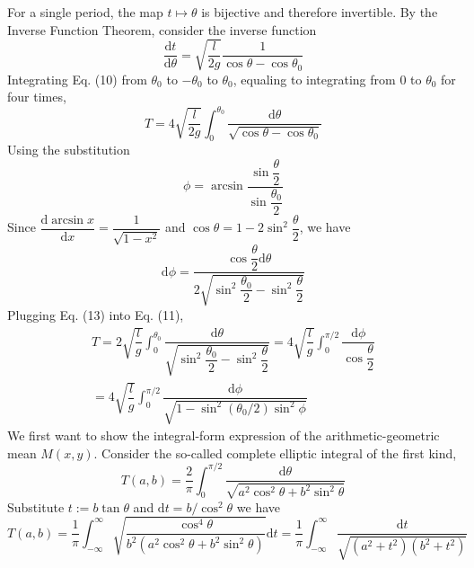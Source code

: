 \documentclass[12pt]{report}
\begin{document}
For a single period, the map $t\mapsto\theta$ is bijective and therefore invertible. By the Inverse Function Theorem, consider the inverse function
\begin{equation}
    \dfrac{\mathrm{d}t}{\mathrm{d}\theta}=\sqrt{\dfrac{l}{2g}}\dfrac{1}{\cos{\theta}-\cos{\theta_0}}
\end{equation}
Integrating Eq. (10) from $\theta_0$ to $-\theta_0$ to $\theta_0$, equaling to integrating from 0 to $\theta_0$ for four times,
\begin{equation}
    T=4\sqrt{\dfrac{l}{2g}}\int_0^{\theta_0}\dfrac{\mathrm{d}\theta}{\sqrt{\cos{\theta}-\cos{\theta_0}}}
\end{equation}
Using the substitution
\begin{equation}
    \phi=\arcsin{\dfrac{\sin{\dfrac{\theta}{2}}}{\sin\dfrac{\theta_0}{2}}}
\end{equation}
Since $\dfrac{\mathrm{d}\arcsin{x}}{\mathrm{d}x}=\dfrac{1}{\sqrt{1-x^2}}$ and $\cos{\theta}=1-2\sin^2{\dfrac{\theta}{2}}$, we have
\begin{equation}
    \mathrm{d}\phi=\dfrac{\cos{\dfrac{\theta}{2}}\mathrm{d}\theta}{2\sqrt{\sin^2{\dfrac{\theta_0}{2}}-\sin^2{\dfrac{\theta}{2}}}}
\end{equation}
Plugging Eq. (13) into Eq. (11),
\begin{equation}
    \begin{split}
        T=2\sqrt{\dfrac{l}{g}}\int_{0}^{\theta_0}\dfrac{\mathrm{d}\theta}{\sqrt{\sin^2{\dfrac{\theta_0}{2}}-\sin^2{\dfrac{\theta}{2}}}}=4\sqrt{\dfrac{l}{g}}\int_{0}^{\pi/2}\dfrac{\mathrm{d}\phi}{\cos\dfrac{\theta}{2}}\\=4\sqrt{\dfrac{l}{g}}\int_{0}^{\pi/2}\dfrac{\mathrm{d}\phi}{\sqrt{1-\sin^2{(\theta_0/2)}\sin^2{\phi}}}
    \end{split}
\end{equation}
We first want to show the integral-form expression of the arithmetic-geometric mean $M(x,y)$. Consider the so-called complete elliptic integral of the first kind,
\begin{equation}
    T(a,b)=\dfrac{2}{\pi}\int_0^{\pi/2}\dfrac{\mathrm{d}\theta}{\sqrt{a^2\cos^2{\theta}+b^2\sin^2{\theta}}}
\end{equation}
Substitute $t:=b\tan{\theta}$ and $\mathrm{d}t=b/\cos^2{\theta}$ we have
\begin{equation}
    T(a,b)=\dfrac{1}{\pi}\int_{-\infty}^{\infty}\sqrt{\dfrac{\cos^4{\theta}}{b^2(a^2\cos^2{\theta}+b^2\sin^2{\theta})}}\mathrm{d}t=\dfrac{1}{\pi}\int_{-\infty}^{\infty}\dfrac{\mathrm{d}t}{\sqrt{(a^2+t^2)(b^2+t^2)}}
\end{equation}
\end{document}
